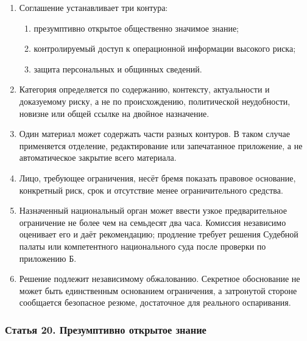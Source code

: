 \documentclass[
  russian,
  11pt,
  a4paper,
]{article}
\providecommand{\tightlist}{%
  \setlength{\itemsep}{0pt}\setlength{\parskip}{0pt}}
\begin{document}
\begin{enumerate}
\def\labelenumi{\arabic{enumi}.}
\tightlist
\item
  Соглашение устанавливает три контура:

  \begin{enumerate}
  \def\labelenumii{\arabic{enumii}.}
  \tightlist
  \item
    презумптивно открытое общественно значимое знание;
  \item
    контролируемый доступ к операционной информации высокого риска;
  \item
    защита персональных и общинных сведений.
  \end{enumerate}
\item
  Категория определяется по содержанию, контексту, актуальности и
  доказуемому риску, а не по происхождению, политической неудобности,
  новизне или общей ссылке на двойное назначение.
\item
  Один материал может содержать части разных контуров. В таком случае
  применяется отделение, редактирование или запечатанное приложение, а
  не автоматическое закрытие всего материала.
\item
  Лицо, требующее ограничения, несёт бремя показать правовое основание,
  конкретный риск, срок и отсутствие менее ограничительного средства.
\item
  Назначенный национальный орган может ввести узкое предварительное
  ограничение не более чем на семьдесят два часа. Комиссия независимо
  оценивает его и даёт рекомендацию; продление требует решения Судебной
  палаты или компетентного национального суда после проверки по
  приложению Б.
\item
  Решение подлежит независимому обжалованию. Секретное обоснование не
  может быть единственным основанием ограничения, а затронутой стороне
  сообщается безопасное резюме, достаточное для реального оспаривания.
\end{enumerate}

\subsubsection{Статья 20. Презумптивно открытое
знание}\label{ux441ux442ux430ux442ux44cux44f-20-ux43fux440ux435ux437ux443ux43cux43fux442ux438ux432ux43dux43e-ux43eux442ux43aux440ux44bux442ux43eux435-ux437ux43dux430ux43dux438ux435}
\end{document}
